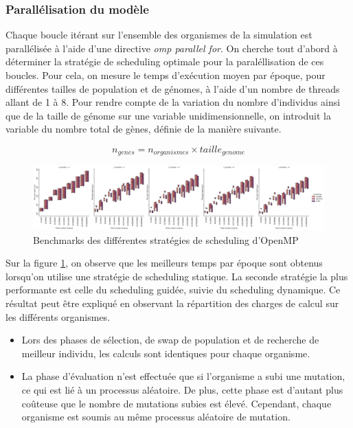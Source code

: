 \documentclass[a4paper, 10pt, twoside]{article}
\begin{document}
\subsubsection{Parallélisation du modèle}

Chaque boucle itérant sur l'ensemble des organismes de la simulation est parallélisée à l'aide d'une directive \textit{omp parallel for}. On cherche tout d'abord à déterminer la stratégie de scheduling optimale pour la paraléllisation de ces boucles. Pour cela, on mesure le temps d'exécution moyen par époque, pour différentes tailles de population et de génomes, à l'aide d'un nombre de threads allant de 1 à 8. Pour rendre compte de la variation du nombre d'individus ainsi que de la taille de génome sur une variable unidimensionnelle, on introduit la variable du nombre total de gènes, définie de la manière suivante.

$$ n_{genes} = n_{organismes} \times taille_{genome} $$

\begin{figure}[htb]
	\centering
	\includegraphics[width=\linewidth]{img/scheduling_strategies_n_genes_by_n_threads.pdf}
	\caption{Benchmarks des différentes stratégies de scheduling d'OpenMP}
	\label{fig:benchmarks/scheduling}
\end{figure}

Sur la figure \ref{fig:benchmarks/scheduling}, on observe que les meilleurs temps par époque sont obtenus lorsqu'on utilise une stratégie de scheduling statique. La seconde stratégie la plus performante est celle du scheduling guidée, suivie du scheduling dynamique. Ce résultat peut être expliqué en observant la répartition des charges de calcul sur les différents organismes.

\begin{itemize}
	\item Lors des phases de sélection, de swap de population et de recherche de meilleur individu, les calculs sont identiques pour chaque organisme.
	\item La phase d'évaluation n'est effectuée que si l'organisme a subi une mutation, ce qui est lié à un processus aléatoire. De plus, cette phase est d'autant plus coûteuse que le nombre de mutations subies est élevé. Cependant, chaque organisme est soumis au même processus aléatoire de mutation.
\end{itemize}
\end{document}
